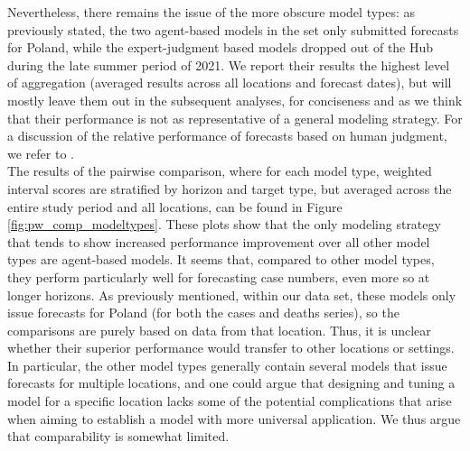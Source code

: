 Nevertheless, there remains the issue of the more obscure model types: as previously stated, the two agent-based models in the set only submitted forecasts for Poland, while the expert-judgment based models dropped out of the Hub during the late summer period of 2021. We report their results the highest level of aggregation (averaged results across all locations and forecast dates), but will mostly leave them out in the subsequent analyses, for conciseness and as we think that their performance is not as representative of a general modeling strategy. For a discussion of the relative performance of forecasts based on human judgment, we refer to \cite{bosse_comparing_2021}.\\ %
The results of the pairwise comparison, where for each model type, weighted interval scores are stratified by horizon and target type, but averaged across the entire study period and all locations, can be found in Figure \ref{fig:pw_comp_modeltypes}. These plots show that the only modeling strategy that tends to show increased performance improvement over all other model types are agent-based models. It seems that, compared to other model types, they perform particularly well for forecasting case numbers, even more so at longer horizons. As previously mentioned, within our data set, these models only issue forecasts for Poland (for both the cases and deaths series), so the comparisons are purely based on data from that location. Thus, it is unclear whether their superior performance would transfer to other locations or settings. In particular, the other model types generally contain several models that issue forecasts for multiple locations, and one could argue that designing and tuning a model for a specific location lacks some of the potential complications that arise when aiming to establish a model with more universal application. We thus argue that comparability is somewhat limited.
